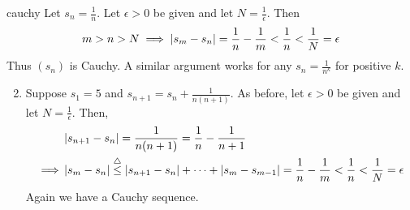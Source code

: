 \begin{examples}{}{cauchy}
	\exstart Let $s_n=\frac 1n$. Let $\epsilon>0$ be given and let $N=\frac 1\epsilon$. Then\footnotemark
	\[m>n>N\implies \left| s_m-s_n\right|=\frac 1n-\frac 1m<\frac 1n<\frac 1N=\epsilon\]
	Thus $(s_n)$ is Cauchy. A similar argument works for any $s_n=\frac 1{n^k}$ for positive $k$.
	  
	\begin{enumerate}\setcounter{enumi}{1}
	  \item\label{ex:cauchy3} Suppose $s_1=5$ and $s_{n+1}=s_n+\frac{1}{n(n+1)}$. As before, let $\epsilon>0$ be given and let $N=\frac 1\epsilon$. Then,
	  \begin{align*}
	  &\left| s_{n+1}-s_n\right|=\frac 1{n(n+1)}=\frac 1n-\frac 1{n+1}\\
	  \implies &\left| s_m-s_n\right|\overset{\triangle}{\le} \left| s_{n+1}-s_n\right|+\cdots+\left| s_m-s_{m-1}\right| = \frac 1n-\frac 1m<\frac 1n<\frac 1N=\epsilon
	  \end{align*}
	  Again we have a Cauchy sequence.
	  
	  \goodbreak
	  

\end{enumerate}
\end{examples}
